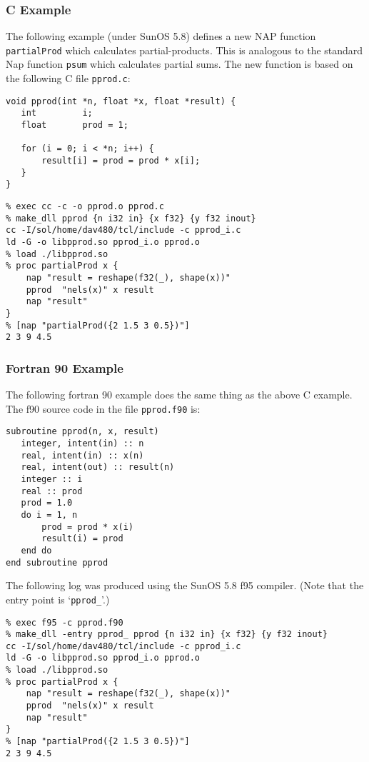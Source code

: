 \subsubsection{C Example}
    \label{make-dll-C-example}

The following example (under SunOS 5.8) defines a new NAP
  function 
  \texttt{partialProd} which calculates partial-products. This is
  analogous to the standard Nap function 
  \texttt{psum} which calculates partial sums. The new function is
  based on the following C file 
  \texttt{pprod.c}:
  \begin{verbatim}
void pprod(int *n, float *x, float *result) {
   int         i;
   float       prod = 1;

   for (i = 0; i < *n; i++) {
       result[i] = prod = prod * x[i];
   }
}
\end{verbatim}

  \begin{verbatim}
% exec cc -c -o pprod.o pprod.c
% make_dll pprod {n i32 in} {x f32} {y f32 inout}
cc -I/sol/home/dav480/tcl/include -c pprod_i.c
ld -G -o libpprod.so pprod_i.o pprod.o  
% load ./libpprod.so                             
% proc partialProd x {
    nap "result = reshape(f32(_), shape(x))"
    pprod  "nels(x)" x result
    nap "result"
}
% [nap "partialProd({2 1.5 3 0.5})"]
2 3 9 4.5
\end{verbatim}

\subsubsection{Fortran 90 Example}
    \label{make-dll-f90-example}

The following fortran 90 example does the same thing as the
  above C example. The f90 source code in the file 
  \texttt{pprod.f90} is:
  \begin{verbatim}
subroutine pprod(n, x, result)
   integer, intent(in) :: n
   real, intent(in) :: x(n)
   real, intent(out) :: result(n)
   integer :: i
   real :: prod
   prod = 1.0
   do i = 1, n
       prod = prod * x(i)
       result(i) = prod
   end do
end subroutine pprod
\end{verbatim}

The following log was produced using the SunOS 5.8 f95 compiler.
  (Note that the entry point is `\texttt{pprod\_}'.)
  \begin{verbatim}
% exec f95 -c pprod.f90
% make_dll -entry pprod_ pprod {n i32 in} {x f32} {y f32 inout}
cc -I/sol/home/dav480/tcl/include -c pprod_i.c
ld -G -o libpprod.so pprod_i.o pprod.o  
% load ./libpprod.so
% proc partialProd x {
    nap "result = reshape(f32(_), shape(x))"
    pprod  "nels(x)" x result
    nap "result"
}
% [nap "partialProd({2 1.5 3 0.5})"]
2 3 9 4.5
\end{verbatim}

